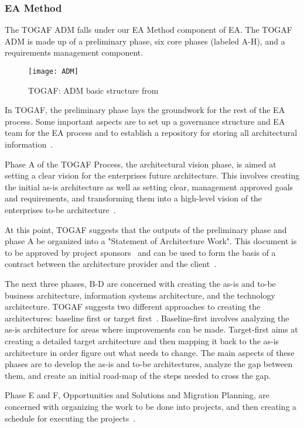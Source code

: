 \subsubsection{EA Method}
The TOGAF ADM falls under our EA Method component of EA. The TOGAF ADM is made up of a preliminary phase, six core phases (labeled A-H), and a requirements management component. 

\begin{figure}
\centering
\texttt{[image: ADM]}
\caption{TOGAF: ADM basic structure from \cite[Ch. 5.2.2]{togaf9.1}}
\label{fig:ADM}
\end{figure}

In TOGAF, the preliminary phase lays the groundwork for the rest of the EA process. Some important aspects are to set up a governance structure and EA team for the EA process and to establish a repository for storing all architectural information~\cite[Ch. 6]{togaf9.1}.

Phase A of the TOGAF Process, the architectural vision phase, is aimed at setting a clear vision for the enterprises future architecture. This involves creating the initial as-is architecture as well as setting clear, management approved goals and requirements, and transforming them into a high-level vision of the enterprises to-be architecture~\cite[Ch. 7]{togaf9.1}.

At this point, TOGAF suggests that the outputs of the preliminary phase and phase A be organized into a "Statement of Architecture Work". This document is to be approved by project sponsors~\cite[Ch. 7.4.11]{togaf9.1} and can be used to form the basis of a contract between the architecture provider and the client~\cite[Ch. 36.2.20]{togaf9.1}.

The next three phases, B-D are concerned with creating the as-is and to-be business architecture, information systems architecture, and the technology architecture. TOGAF suggests two different approaches to creating the architectures: baseline first or target first~\cite[Ch. 19.4]{togaf9.1}. Baseline-first involves analyzing the as-is architecture for areas where improvements can be made. Target-first aims at creating a detailed target architecture and then mapping it back to the as-is architecture in order figure out what needs to change. The main aspects of these phases are to develop the as-is and to-be architectures, analyze the gap between them, and create an initial road-map of the steps needed to cross the gap.

Phase E and F, Opportunities and Solutions and Migration Planning, are concerned with organizing the work to be done into projects, and then creating a schedule for executing the projects~\cite[Ch. 13-14]{togaf9.1}.

